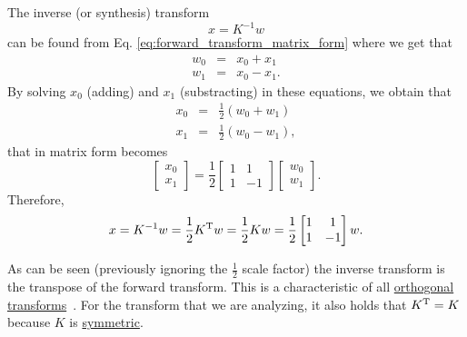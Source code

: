The inverse (or synthesis) transform
\begin{equation}
  x = K^{-1}w
  \label{eq:inverse_transform}
\end{equation}
can be found from Eq. \ref{eq:forward_transform_matrix_form} where we
get that
\begin{equation}
  \begin{array}{rcl}
  w_0 & = & x_0 + x_1\\
  w_1 & = & x_0 - x_1.
  \end{array}
\end{equation}
By solving $x_0$ (adding) and $x_1$ (substracting) in
these equations, we obtain that
\begin{equation}
  \begin{array}{rcl}
  x_0 & = & \frac{1}{2}(w_0 + w_1)\\
  x_1 & = & \frac{1}{2}(w_0 - w_1),
  \end{array}
\end{equation}
that in matrix form becomes
\begin{equation}
  \begin{bmatrix}
    x_0 \\
    x_1
  \end{bmatrix}
  = \frac{1}{2}
  \begin{bmatrix} 1 & 1 \\ 1 & -1 \end{bmatrix}
  \begin{bmatrix}
    w_0 \\
    w_1
  \end{bmatrix}.
\end{equation}
Therefore,
\begin{equation}
  x = K^{-1}w = \frac{1}{2}K^{\text T}w = \frac{1}{2}Kw = \frac{1}{2}\begin{bmatrix} 1 & 1 \\ 1 & -1 \end{bmatrix}w.
  \label{eq:inverse_transform_matrix_form}
\end{equation}

As can be seen (previously ignoring the $\frac{1}{2}$ scale factor)
the inverse transform is the transpose of the forward transform. This
is a characteristic of all
\href{https://en.wikipedia.org/wiki/Orthogonal_transformation}{orthogonal
  transforms}~\cite{sayood2017introduction}. For the transform that we
are analyzing, it also holds that $K^{\text T}=K$ because $K$ is
\href{https://en.wikipedia.org/wiki/Symmetric_matrix}{symmetric}.

